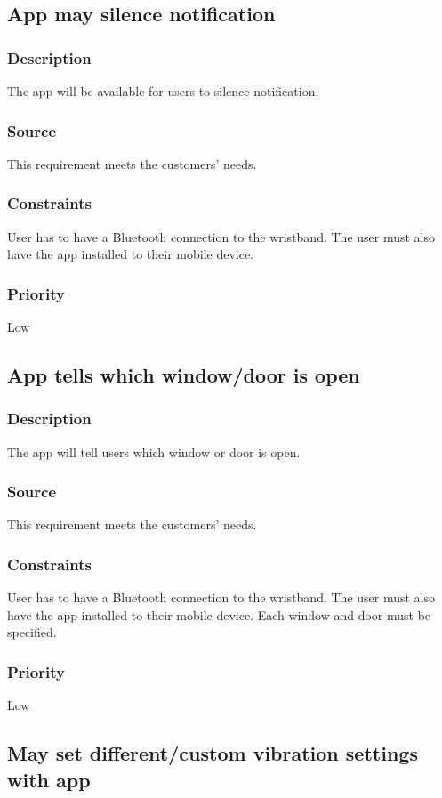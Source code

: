 \subsection{App may silence notification}
\subsubsection{Description}
The app will be available for users to silence notification.
\subsubsection{Source}
This requirement meets the customers' needs.
\subsubsection{Constraints}
User has to have a Bluetooth connection to the wristband. The user must also have the app installed to their mobile device.
\subsubsection{Priority}
Low

\subsection{App tells which window/door is open}
\subsubsection{Description}
The app will tell users which window or door is open. 
\subsubsection{Source}
This requirement meets the customers' needs.
\subsubsection{Constraints}
User has to have a Bluetooth connection to the wristband. The user must also have the app installed to their mobile device. Each window and door must be specified.
\subsubsection{Priority}
Low

\subsection{May set different/custom vibration settings with app}
